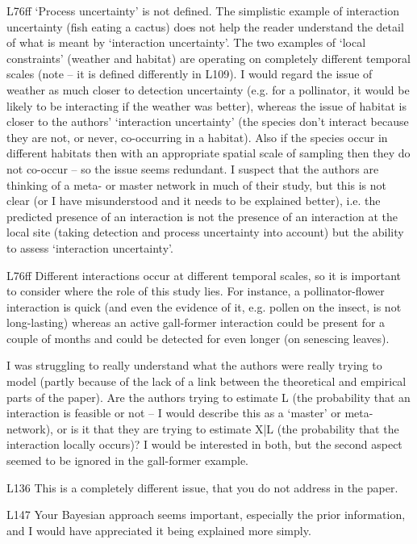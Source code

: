 L76ff ‘Process uncertainty’ is not defined. The simplistic example of interaction uncertainty (fish eating a cactus) does not help the reader understand the detail of what is meant by ‘interaction uncertainty’. The two examples of ‘local constraints’ (weather and habitat) are operating on completely different temporal scales (note – it is defined differently in L109). I would regard the issue of weather as much closer to detection uncertainty (e.g. for a pollinator, it would be likely to be interacting if the weather was better), whereas the issue of habitat is closer to the authors’ ‘interaction uncertainty’ (the species don’t interact because they are not, or never, co-occurring in a habitat). Also if the species occur in different habitats then with an appropriate spatial scale of sampling then they do not co-occur – so the issue seems redundant. I suspect that the authors are thinking of a meta- or master network in much of their study, but this is not clear (or I have misunderstood and it needs to be explained better), i.e. the predicted presence of an interaction is not the presence of an interaction at the local site (taking detection and process uncertainty into account) but the ability to assess ‘interaction uncertainty’.

L76ff Different interactions occur at different temporal scales, so it is important to consider where the role of this study lies. For instance, a pollinator-flower interaction is quick (and even the evidence of it, e.g. pollen on the insect, is not long-lasting) whereas an active gall-former interaction could be present for a couple of months and could be detected for even longer (on senescing leaves).

I was struggling to really understand what the authors were really trying to model (partly because of the lack of a link between the theoretical and empirical parts of the paper). Are the authors trying to estimate L (the probability that an interaction is feasible or not – I would describe this as a ‘master’ or meta- network), or is it that they are trying to estimate X|L (the probability that the interaction locally occurs)? I would be interested in both, but the second aspect seemed to be ignored in the gall-former example.

L136 This is a completely different issue, that you do not address in the paper.

L147 Your Bayesian approach seems important, especially the prior information, and I would have appreciated it being explained more simply.

